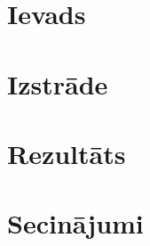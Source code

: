 \documentclass[12pt,a4paper,oneside]{article}
\begin{document}



\clearpage
\tableofcontents
\clearpage

\newpage
\section{Ievads}


\newpage
\section{Izstrāde}


\newpage
\section{Rezultāts}


\newpage
\section{Secinājumi}


\newpage
\printbibliography
\end{document}
